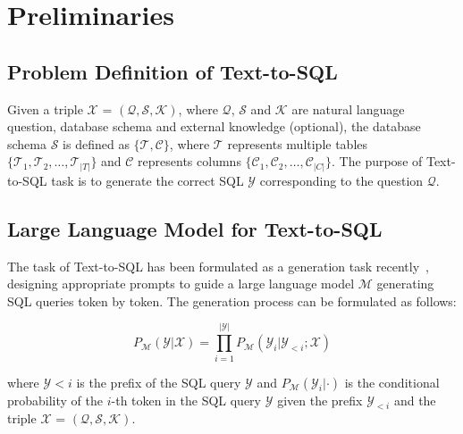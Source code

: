 \section{Preliminaries}

\subsection{Problem Definition of Text-to-SQL}

Given a triple $\mathcal{X}$ = $(\mathcal{Q}, \mathcal{S}, \mathcal{K})$, where $\mathcal{Q}$, $\mathcal{S}$ and $\mathcal{K}$ are natural language question, database schema and external knowledge (optional), the database schema $\mathcal{S}$ is defined as $\{\mathcal{T},\mathcal{C}\}$, where $\mathcal{T}$ represents multiple tables $\{\mathcal{T}_{1},\mathcal{T}_{2},\dots,\mathcal{T}_{|T|}\}$ and $\mathcal{C}$ represents columns $\{\mathcal{C}_{1},\mathcal{C}_{2},\dots,\mathcal{C}_{|C|}\}$. 
The purpose of Text-to-SQL task is to generate the correct SQL $\mathcal{Y}$ corresponding to the question $\mathcal{Q}$. 

\subsection{Large Language Model for Text-to-SQL}

The task of Text-to-SQL has been formulated as a generation task recently~\cite{dong2023c3,pourreza2023dinsql}, designing appropriate prompts to guide a large language model $\mathcal{M}$ generating SQL queries token by token. The generation process can be formulated as follows:

\begin{equation}
P_{\mathcal{M}}(\mathcal{Y} | \mathcal{X}) = \prod_{i=1}^{|\mathcal{Y}|} P_{\mathcal{M}}(\mathcal{Y}_i | \mathcal{Y}_{<i}; \mathcal{X})
\label{eq:baset2s}
\end{equation}

where $\mathcal{Y}{<i}$ is the prefix of the SQL query $\mathcal{Y}$ and $P_{\mathcal{M}}(\mathcal{Y}_i | \cdot)$ is the conditional probability of the $i$-th token in the SQL query $\mathcal{Y}$ given the prefix $\mathcal{Y}_{<i}$ and the triple $\mathcal{X}$ = $(\mathcal{Q}, \mathcal{S}, \mathcal{K})$.

